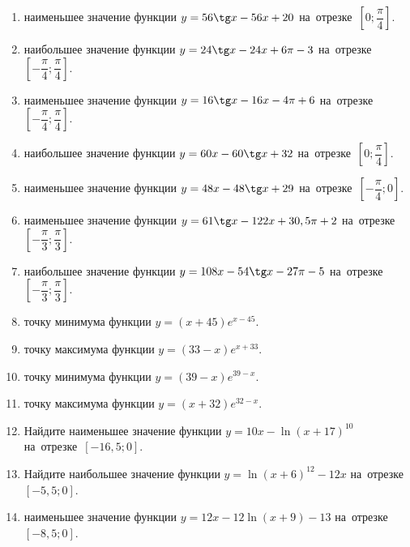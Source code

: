 \documentclass[a4paper,10pt]{article}
\begin{document}
\begin{enumerate}
\item {} наименьшее значение функции $y = 56\tg x-56x+20$ на~отрезке~$\left[0;\dfrac{\pi }{4}\right]$.

\item {} наибольшее значение функции $y=24\tg x-24x+6\pi -3$ на~отрезке~$\left[-\dfrac{\pi }{4};\dfrac{\pi }{4}\right]$.

\item {} наименьшее значение функции $y=16\tg x-16x-4\pi +6$ на~отрезке~$\left[-\dfrac{\pi }{4};\dfrac{\pi }{4}\right]$.

\item {} наибольшее значение функции $y = 60x-60\tg x +32$ на~отрезке~$\left[0;\dfrac{\pi }{4}\right]$.

\item {} наименьшее значение функции $y = 48x-48\tg x +29$ на~отрезке~$\left[-\dfrac{\pi }{4};0\right]$.

\item {} наименьшее значение функции $y = 61\tg x-122x+30,5 \pi +2$ на~отрезке~$\left[-\dfrac{\pi }{3};\dfrac{\pi }{3}\right]$.

\item {} наибольшее значение функции $y = 108x-54\tg x-27\pi -5$ на~отрезке~$\left[-\dfrac{\pi }{3};\dfrac{\pi }{3}\right]$.

\item {} точку минимума функции $y = \left(x+45\right)e^{x-45}$.

\item {} точку максимума функции $y = \left(33-x\right)e^{x+33}$.

\item {} точку минимума функции $y = \left(39-x\right)e^{39-x}$.

\item {} точку максимума функции $y = \left(x+32\right)e^{32-x}$.

\item Найдите наименьшее значение функции $y = 10x-\ln \left(x+17\right)^{10}$ на~отрезке~$\left[-16,5;0\right]$.

\item Найдите наибольшее значение функции $y = \ln \left(x+6\right)^{12}-12x$ на~отрезке~$\left[-5,5;0\right]$.

\item {} наименьшее значение функции $y = 12x-12\ln \left(x+9\right) -13$ на~отрезке~$\left[-8,5;0\right]$.


\end{enumerate}
\end{document}
